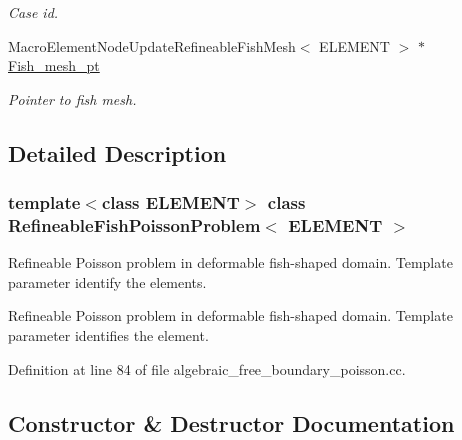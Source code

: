 \begin{DoxyCompactItemize}
\begin{DoxyCompactList}\small\item\em Case id. \end{DoxyCompactList}\item 
Macro\+Element\+Node\+Update\+Refineable\+Fish\+Mesh$<$ E\+L\+E\+M\+E\+NT $>$ $\ast$ \hyperlink{classRefineableFishPoissonProblem_a769ab4e05f6962a7c8fc85f03a261916}{Fish\+\_\+mesh\+\_\+pt}
\begin{DoxyCompactList}\small\item\em Pointer to fish mesh. \end{DoxyCompactList}\end{DoxyCompactItemize}


\subsection{Detailed Description}
\subsubsection*{template$<$class E\+L\+E\+M\+E\+NT$>$\newline
class Refineable\+Fish\+Poisson\+Problem$<$ E\+L\+E\+M\+E\+N\+T $>$}

Refineable Poisson problem in deformable fish-\/shaped domain. Template parameter identify the elements.

Refineable Poisson problem in deformable fish-\/shaped domain. Template parameter identifies the element. 

Definition at line 84 of file algebraic\+\_\+free\+\_\+boundary\+\_\+poisson.\+cc.



\subsection{Constructor \& Destructor Documentation}
\mbox{\label{classRefineableFishPoissonProblem_a2585d906fab348e09bfb9b4c111ac161}} 
